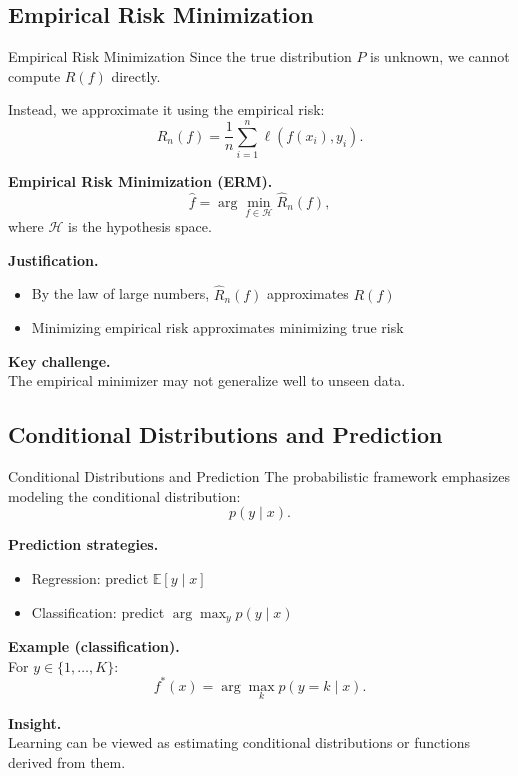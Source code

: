 \documentclass[aspectratio=169,11pt]{beamer}
\begin{document}
\subsection{Empirical Risk Minimization}
\begin{frame}[t,allowframebreaks]{Empirical Risk Minimization}
\small
Since the true distribution $P$ is unknown, we cannot compute $R(f)$ directly.

Instead, we approximate it using the empirical risk:
\[
\hat{R}_n(f) = \frac{1}{n} \sum_{i=1}^n \ell(f(x_i), y_i).
\]

\textbf{Empirical Risk Minimization (ERM).}\\ \[
\hat{f} = \arg\min_{f \in \mathcal{H}} \hat{R}_n(f),
\]
where $\mathcal{H}$ is the hypothesis space.

\textbf{Justification.}\\ \begin{itemize}
    \item By the law of large numbers, $\hat{R}_n(f)$ approximates $R(f)$
    \item Minimizing empirical risk approximates minimizing true risk
\end{itemize}

\textbf{Key challenge.}\\ The empirical minimizer may not generalize well to unseen data.
\end{frame}

\subsection{Conditional Distributions and Prediction}
\begin{frame}[t,allowframebreaks]{Conditional Distributions and Prediction}
\small
The probabilistic framework emphasizes modeling the conditional distribution:
\[
p(y \mid x).
\]

\textbf{Prediction strategies.}\\ \begin{itemize}
    \item Regression: predict $\mathbb{E}[y \mid x]$
    \item Classification: predict $\arg\max_y p(y \mid x)$
\end{itemize}

\textbf{Example (classification).}\\ For $y \in \{1, \dots, K\}$:
\[
f^*(x) = \arg\max_k p(y = k \mid x).
\]

\textbf{Insight.}\\ Learning can be viewed as estimating conditional distributions or functions derived from them.
\end{frame}
\end{document}
